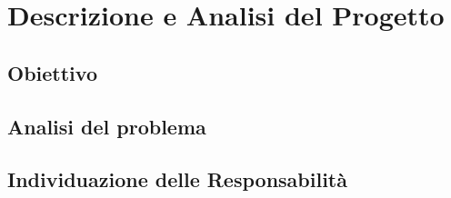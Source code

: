 \chapter{Descrizione e Analisi del Progetto}
\section{Obiettivo}
\section{Analisi del problema}
\section{Individuazione delle Responsabilità}
\newpage